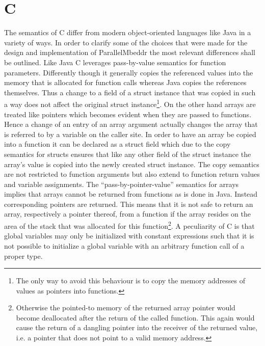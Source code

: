 \section{C}
\label{cBasics}
The semantics of C differ from modern object-oriented languages like Java in a variety of ways. In order to clarify some of the choices that were made for the design and implementation of ParallelMbeddr the most relevant differences shall be outlined. Like Java C leverages pass-by-value semantics for function parameters. Differently though it generally copies the referenced values into the memory that is allocated for function calls whereas Java copies the references themselves. Thus a change to a field of a struct instance that was copied in such a way does not affect the original struct instance\footnote{The only way to avoid this behaviour is to copy the memory addresses of values as pointers into functions.}. On the other hand arrays are treated like pointers which becomes evident when they are passed to functions. Hence a change of an entry of an array argument actually changes the array that is referred to by a variable on the caller site. In order to have an array be copied into a function it can be declared as a struct field which due to the copy semantics for structs ensures that like any other field of the struct instance the array's value is copied into the newly created struct instance. The copy semantics are not restricted to function arguments but also extend to function return values and variable assignments. The ``pass-by-pointer-value'' semantics for arrays implies that arrays cannot be returned from functions as is done in Java. Instead corresponding pointers are returned. This means that it is not safe to return an array, respectively a pointer thereof, from a function if the array resides on the area of the stack that was allocated for this function\footnote{Otherwise the pointed-to memory of the returned array pointer would become deallocated after the return of the called function. This again would cause the return of a dangling pointer into the receiver of the returned value, i.e. a pointer that does not point to a valid memory address.}. 
A peculiarity of C is that global variables may only be initialized with constant expressions such that it is not possible to initialize a global variable with an arbitrary function call of a proper type\cite[p.~48]{CForBASICProgrammers}.



